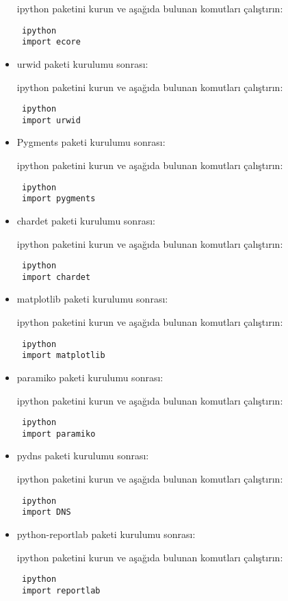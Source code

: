 \documentclass[a4paper,10pt]{article}
\begin{document}
\begin{itemize}
ipython paketini kurun ve aşağıda bulunan komutları çalıştırın:
\begin{verbatim}
 ipython
 import ecore
\end{verbatim}


\item urwid paketi kurulumu sonrası:

ipython paketini kurun ve aşağıda bulunan komutları çalıştırın:
\begin{verbatim}
 ipython
 import urwid
\end{verbatim}


\item Pygments paketi kurulumu sonrası:

ipython paketini kurun ve aşağıda bulunan komutları çalıştırın:
\begin{verbatim}
 ipython
 import pygments
\end{verbatim}

\item chardet paketi kurulumu sonrası:

ipython paketini kurun ve aşağıda bulunan komutları çalıştırın:
\begin{verbatim}
 ipython
 import chardet
\end{verbatim}

\item matplotlib paketi kurulumu sonrası:

ipython paketini kurun ve aşağıda bulunan komutları çalıştırın:
\begin{verbatim}
 ipython
 import matplotlib
\end{verbatim}

\item paramiko paketi kurulumu sonrası:

ipython paketini kurun ve aşağıda bulunan komutları çalıştırın:
\begin{verbatim}
 ipython
 import paramiko
\end{verbatim}

\item pydns paketi kurulumu sonrası:

ipython paketini kurun ve aşağıda bulunan komutları çalıştırın:
\begin{verbatim}
 ipython
 import DNS
\end{verbatim}


\item python-reportlab paketi kurulumu sonrası:

ipython paketini kurun ve aşağıda bulunan komutları çalıştırın:
\begin{verbatim}
 ipython
 import reportlab
\end{verbatim}


\end{itemize}
\end{document}
